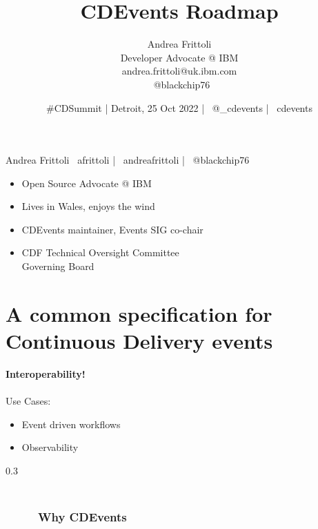 \documentclass[aspectratio=169,11pt,hyperref={colorlinks=true}]{beamer}
\title{CDEvents Roadmap}
\date[25 Oct 2022]{\#CDSummit | Detroit, 25 Oct 2022 | \faTwitter ~@\_cdevents | \faGithub ~cdevents}
\author[Andrea Frittoli]{%
  Andrea Frittoli \\
  Developer Advocate @ IBM\\
  andrea.frittoli@uk.ibm.com \\
  \faTwitter ~@blackchip76 \\
}
\begin{document}
\begin{frame}
\titlepage{}
\end{frame}


\begin{speakerframe}{Andrea Frittoli}%
  {%
  \faGithub ~afrittoli | \faLinkedin ~andreafrittoli | \faTwitter ~@blackchip76
  }%
  {%
  \begin{itemize}
    \item{Open Source Advocate @ IBM}
    \item{Lives in Wales, enjoys the wind}
    \item{CDEvents maintainer, Events SIG co-chair}
    \item{CDF Technical Oversight Committee \\ Governing Board}
  \end{itemize}
  }%
\end{speakerframe}

\section[CDEvents]{A common specification for Continuous Delivery events}
\begin{sectionwithpicmediumcentral}{}
\end{sectionwithpicmediumcentral}

\begin{lpicrblack}[whycdevents]{}%
  {%
  \textbf{Interoperability!} \\
  ~ \\
  Use Cases:
  \begin{itemize}
    \item Event driven workflows
    \item Observability 
  \end{itemize}
  }%
  {0.3}
  \frametitle{~~~~~~~~~~~~~~~~~~~~~~~~~~~~~~~~~~~~~~~~~~~~~~~~~~~~~~~~~~Why CDEvents}
\end{lpicrblack}
\end{document}

